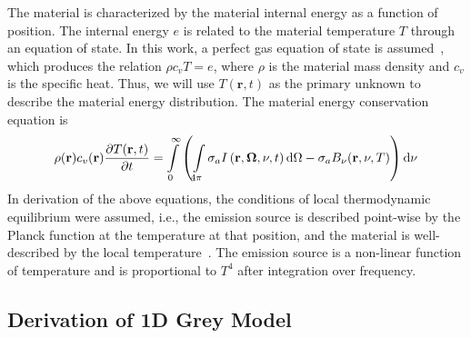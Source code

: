 The material is characterized by the material internal
energy as a function of position.  The internal energy $e$ is related to the material
temperature $T$ through an equation of state.   In this work, a perfect gas equation of state is
assumed~\cite{toro}, which produces the relation $\rho c_v T = e$, where $\rho$ is the
material mass density and $c_v$ is the specific heat.  Thus, we will use $T(\mathbf{r},t)$ as the
primary unknown to describe the material energy distribution.  The material energy conservation equation is
\begin{equation}
    \rho(\mathbf{r}) c_v(\mathbf{r}) \frac{\partial T(\mathbf{r},t)}{\partial t} = \int\limits_0^\infty
    \left( \int\limits_{4\pi} \sigma_a I \left(\mathbf{r},\mathbf{\Omega},\nu,t\right) \mathrm{d} \Omega - \sigma_a B_\nu(\mathbf{r},\nu,T) \right) \mathrm{d} \nu
 \end{equation}
 In derivation of the above equations, the conditions of local thermodynamic equilibrium
were assumed, i.e., the emission source is described point-wise by the
Planck function at the temperature at that position, and the material is well-described by
the local temperature~\cite{mihalas,wollaber_thesis}. The emission source is a non-linear function of temperature and is
proportional to $T^4$ after integration over frequency.  
\subsection{Derivation of 1D Grey Model}

